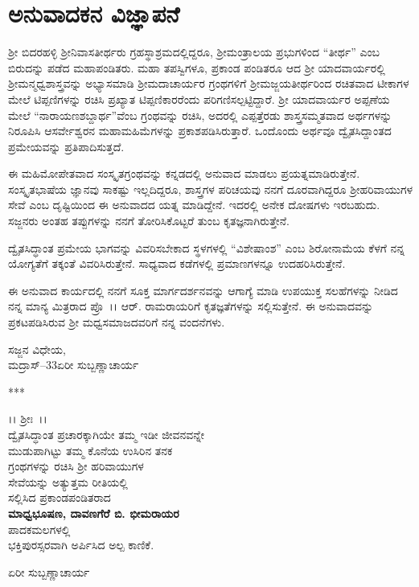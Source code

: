 
\chapter*{ಅನುವಾದಕನ ವಿಜ್ಞಾಪನೆ}

 ಶ‍್ರೀ ಬಿದರಹಳ್ಳಿ ಶ‍್ರೀನಿವಾಸತೀರ್ಥರು ಗ್ರಹಸ್ಥಾಶ್ರಮದಲ್ಲಿದ್ದರೂ, ಶ‍್ರೀಮಂತ್ರಾಲಯ ಪ್ರಭು\-ಗಳಿಂದ “ತೀರ್ಥ” ಎಂಬ ಬಿರುದನ್ನು ಪಡೆದ ಮಹಾಪಂಡಿತರು. ಮಹಾ ತಪಸ್ವಿ\-ಗಳೂ, ಪ್ರಕಾಂಡ ಪಂಡಿತರೂ ಆದ ಶ‍್ರೀ ಯಾದವಾರ್ಯರಲ್ಲಿ ಶ‍್ರೀಮನ್ಮಧ್ವಶಾಸ್ತ್ರವನ್ನು ಅಭ್ಯಾಸ\-ಮಾಡಿ ಶ‍್ರೀಮದಾಚಾರ್ಯರ ಗ್ರಂಥಗಳಿಗೆ ಶ‍್ರೀಮಜ್ಜಯತೀರ್ಥರಿಂದ ರಚಿತವಾದ ಟೀಕಾ\-ಗಳ ಮೇಲೆ ಟಿಪ್ಪಣಿಗಳನ್ನು ರಚಿಸಿ ಪ್ರಖ್ಯಾತ ಟಿಪ್ಪಣಿಕಾರರೆಂದು ಪರಿಗಣಿಸಲ್ಪಟ್ಟಿದ್ದಾರೆ. ಶ‍್ರೀ ಯಾದವಾರ್ಯರ ಅಪ್ಪಣೆಯ ಮೇಲೆ “ನಾರಾಯಣಶಬ್ದಾರ್ಥ”ವೆಂಬ ಗ್ರಂಥವನ್ನು ರಚಿಸಿ, ಅದರಲ್ಲಿ ಎಪ್ಪತ್ತೆರಡು ಶಾಸ್ತ್ರಸಮ್ಮತವಾದ ಅರ್ಥಗಳನ್ನು ನಿರೂಪಿಸಿ ಆ\break ಸರ್ವೇಶ್ವರನ ಮಹಾಮಹಿಮೆಗಳನ್ನು ಪ್ರಕಾಶಪಡಿಸಿರುತ್ತಾರೆ. ಒಂದೊಂದು ಅರ್ಥವೂ ದ್ವೈತ\-ಸಿದ್ದಾಂತದ ಪ್ರಮೇಯವನ್ನು ಪ್ರತಿಪಾದಿಸುತ್ತದೆ.

ಈ ಮಹಿಮೋಪೇತವಾದ ಸಂಸ್ಕೃತಗ್ರಂಥವನ್ನು ಕನ್ನಡದಲ್ಲಿ ಅನುವಾದ ಮಾಡಲು ಪ್ರಯತ್ನ\-ಮಾಡಿರುತ್ತೇನೆ. ಸಂಸ್ಕೃತಭಾಷೆಯ ಜ್ಞಾನವು ಸಾಕಷ್ಟು ಇಲ್ಲದಿದ್ದರೂ, ಶಾಸ್ತ್ರಗಳ ಪರಿ\-ಚಯವು ನನಗೆ ದೂರವಾಗಿದ್ದರೂ ಶ‍್ರೀಹರಿವಾಯುಗಳ ಸೇವೆ ಎಂಬ ದೃಷ್ಟಿಯಿಂದ ಈ ಅನುವಾದದ ಯತ್ನ ಮಾಡಿದ್ದೇನೆ. ಇದರಲ್ಲಿ ಅನೇಕ ದೋಷಗಳು ಇರಬಹುದು. ಸಜ್ಜನರು ಅಂತಹ ತಪ್ಪುಗಳನ್ನು ನನಗೆ ತೋರಿಸಿಕೊಟ್ಟರೆ ತುಂಬ ಕೃತಜ್ಞನಾಗಿರುತ್ತೇನೆ.

ದ್ವೈತಸಿದ್ಧಾಂತ ಪ್ರಮೇಯ ಭಾಗವನ್ನು ವಿವರಿಸಬೇಕಾದ ಸ್ಥಳಗಳಲ್ಲಿ “ವಿಶೇಷಾಂಶ” ಎಂಬ ಶಿರೋನಾಮೆಯ ಕೆಳಗೆ ನನ್ನ ಯೋಗ್ಯತೆಗೆ ತಕ್ಕಂತೆ ವಿವರಿಸಿರುತ್ತೇನೆ. ಸಾಧ್ಯವಾದ ಕಡೆ\-ಗಳಲ್ಲಿ ಪ್ರಮಾಣಗಳನ್ನೂ ಉದಹರಿಸಿರುತ್ತೇನೆ.

\newpage

ಈ ಅನುವಾದ ಕಾರ್ಯದಲ್ಲಿ ನನಗೆ ಸೂಕ್ತ ಮಾರ್ಗದರ್ಶನವನ್ನು ಆಗಾಗ್ಯೆ ಮಾಡಿ ಉಪಯುಕ್ತ ಸಲಹೆಗಳನ್ನು ನೀಡಿದ ನನ್ನ ಮಾನ್ಯ ಮಿತ್ರರಾದ ಪ್ರೊ~।। ಆರ್. ರಾಮರಾಯರಿಗೆ ಕೃತ\-ಜ್ಞತೆಗಳನ್ನು ಸಲ್ಲಿಸುತ್ತೇನೆ. ಈ ಅನುವಾದವನ್ನು ಪ್ರಕಟಪಡಿಸಿರುವ ಶ‍್ರೀ ಮಧ್ವಸಮಾಜ\-ದವರಿಗೆ ನನ್ನ ವಂದನೆಗಳು.

\vskip 1cm

\begin{flushleft}
\hfill ಸಜ್ಜನ ವಿಧೇಯ,\\ಮದ್ರಾಸ್–33\hfill ಏರೀ ಸುಬ್ಬಣ್ಣಾಚಾರ್ಯ
\end{flushleft}

\begin{center}
***
\end{center}

\newpage

\phantom{}

\vfill

\begin{center}
।। ಶ‍್ರೀಃ~।।\\ ದ್ವೈತಸಿದ್ಧಾಂತ ಪ್ರಚಾರಕ್ಕಾಗಿಯೇ ತಮ್ಮ ಇಡೀ ಜೀವನವನ್ನೇ\\ ಮುಡುಪಾಗಿಟ್ಟು ತಮ್ಮ ಕೊನೆಯ ಉಸಿರಿನ ತನಕ\\ ಗ್ರಂಥಗಳನ್ನು ರಚಿಸಿ ಶ‍್ರೀ ಹರಿವಾಯುಗಳ\\ ಸೇವೆಯನ್ನು ಅತ್ಯುತ್ತಮ ರೀತಿಯಲ್ಲಿ\\ ಸಲ್ಲಿಸಿದ ಪ್ರಕಾಂಡಪಂಡಿತರಾದ\\\textbf{ಮಾಧ್ವಭೂಷಣ, ದಾವಣಗೆರೆ ಬಿ. ಭೀಮರಾಯರ}\\ ಪಾದಕಮಲಗಳಲ್ಲಿ\\ ಭಕ್ತಿಪುರಸ್ಸರವಾಗಿ ಅರ್ಪಿಸಿದ ಅಲ್ಪ ಕಾಣಿಕೆ.
\end{center}

\begin{flushright}
ಏರೀ ಸುಬ್ಬಣ್ಣಾಚಾರ್ಯ
\end{flushright}

